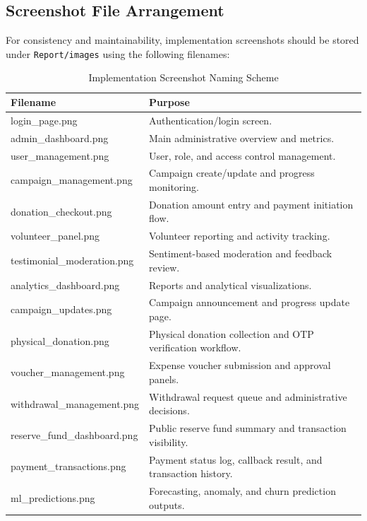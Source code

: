 \documentclass{thesis-library}
\begin{document}
\subsection{Screenshot File Arrangement}
For consistency and maintainability, implementation screenshots should be stored under \texttt{Report/\allowbreak{}images} using the following filenames:

\begin{table}[H]
    \centering
    \caption{Implementation Screenshot Naming Scheme}
    \vspace{10pt}
    \begin{tabularx}{\linewidth}{|P{6.5cm}|L|}
        \hline
        \textbf{Filename} & \textbf{Purpose} \\
        \hline
        login\_page.png & Authentication/login screen. \\
        \hline
        admin\_dashboard.png & Main administrative overview and metrics. \\
        \hline
        user\_management.png & User, role, and access control management. \\
        \hline
        campaign\_management.png & Campaign create/update and progress monitoring. \\
        \hline
        donation\_checkout.png & Donation amount entry and payment initiation flow. \\
        \hline
        volunteer\_panel.png & Volunteer reporting and activity tracking. \\
        \hline
        testimonial\_moderation.png & Sentiment-based moderation and feedback review. \\
        \hline
        analytics\_dashboard.png & Reports and analytical visualizations. \\
        \hline
        campaign\_updates.png & Campaign announcement and progress update page. \\
        \hline
        physical\_donation.png & Physical donation collection and OTP verification workflow. \\
        \hline
        voucher\_management.png & Expense voucher submission and approval panels. \\
        \hline
        withdrawal\_management.png & Withdrawal request queue and administrative decisions. \\
        \hline
        reserve\_fund\_dashboard.png & Public reserve fund summary and transaction visibility. \\
        \hline
        payment\_transactions.png & Payment status log, callback result, and transaction history. \\
        \hline
        ml\_predictions.png & Forecasting, anomaly, and churn prediction outputs. \\
        \hline
    \end{tabularx}
\end{table}
\end{document}
